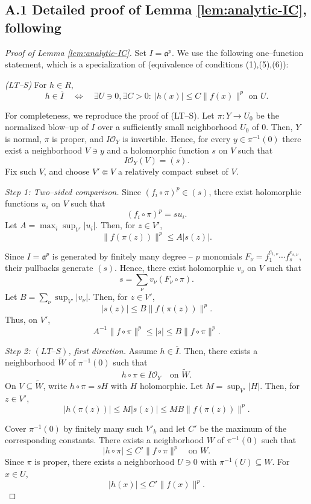 \documentclass[12pt]{amsart}
\renewcommand{\a}{\mathfrak{a}}
\theoremstyle{plain}
\theoremstyle{definition}
\numberwithin{equation}{section}
\begin{document}
\subsection*{A.1 Detailed proof of Lemma \ref{lem:analytic-IC}, following \cite{LT}} \label{app:LT-proof}

\begin{proof}[Proof of Lemma \ref{lem:analytic-IC}]
	Set $I=\a^p$.
	We use the following one--function statement, which is a specialization of
	\cite[Th\'eor\`eme~7.2]{LT} (equivalence of conditions (1),(5),(6)):
	
	\medskip
	\noindent\emph{(LT--S)}
	For $h\in R$,
	\[
	h\in\overline I
	\quad\Longleftrightarrow\quad
	\exists U\ni0,\exists C>0:\ |h(x)|\le C\|f(x)\|^p\text{ on }U.
	\]
	
	For completeness, we reproduce the proof of (LT--S).
	Let $\pi:Y\to U_0$ be the normalized blow--up of $I$ over a sufficiently small
	neighborhood $U_0$ of $0$.
	Then, $Y$ is normal, $\pi$ is proper, and $I\mathcal O_Y$ is invertible.
	Hence, for every $y\in\pi^{-1}(0)$ there exist a neighborhood $V\ni y$ and a
	holomorphic function $s$ on $V$ such that
	\[
	I\mathcal O_Y(V)=(s).
	\]
	Fix such $V$, and choose $V'\Subset V$ a relatively compact subset of $V$.
	
	\medskip
	\noindent\emph{Step 1: Two--sided comparison.}
	Since $(f_i\circ\pi)^p\in(s)$, there exist holomorphic functions $u_i$ on $V$
	such that
	\[
	(f_i\circ\pi)^p=s u_i.
	\]
	Let $A=\max_i\sup_{V'}|u_i|$. Then, for $z\in V'$,
	\[
	\|f(\pi(z))\|^p\le A|s(z)|.
	\]
	
	Since $I=\a^p$ is generated by finitely many degree -- $p$ monomials
	$F_\nu=f_1^{e_{1,\nu}}\cdots f_s^{e_{s,\nu}}$,
	their pullbacks generate $(s)$.
	Hence, there exist holomorphic $v_\nu$ on $V$ such that
	\[
	s=\sum_\nu v_\nu(F_\nu\circ\pi).
	\]
	Let $B=\sum_\nu\sup_{V'}|v_\nu|$. Then, for $z\in V'$,
	\[
	|s(z)|\le B\|f(\pi(z))\|^p.
	\]
	Thus, on $V'$,
	\[
	A^{-1}\|f\circ\pi\|^p\le|s|\le B\|f\circ\pi\|^p.
	\]
	
	\medskip
	\noindent\emph{Step 2: $(LT\text{--}S)$, first direction.}
	Assume $h\in\overline I$. Then, there exists a neighborhood $\tilde W$
	of $\pi^{-1}(0)$ such that
	\[
	h\circ\pi\in I\mathcal O_Y\quad\text{on }\tilde W.
	\]
	On $V \subseteq \tilde W$, write $h\circ\pi=sH$ with $H$ holomorphic.
	Let $M=\sup_{V'}|H|$. Then, for $z\in V'$,
	\[
	|h(\pi(z))|\le M|s(z)|\le MB\|f(\pi(z))\|^p.
	\]
	
	Cover $\pi^{-1}(0)$ by finitely many such $V'_k$ and let $C'$ be the maximum
	of the corresponding constants.
	There exists a neighborhood $W$ of $\pi^{-1}(0)$ such that
	\[
	|h\circ\pi|\le C'\|f\circ\pi\|^p\quad\text{on }W.
	\]
	Since $\pi$ is proper, there exists a neighborhood $U\ni0$ with
	$\pi^{-1}(U)\subseteq W$.
	For $x\in U$,
	\[
	|h(x)|\le C'\|f(x)\|^p.
	\]
	

\end{proof}
\end{document}

